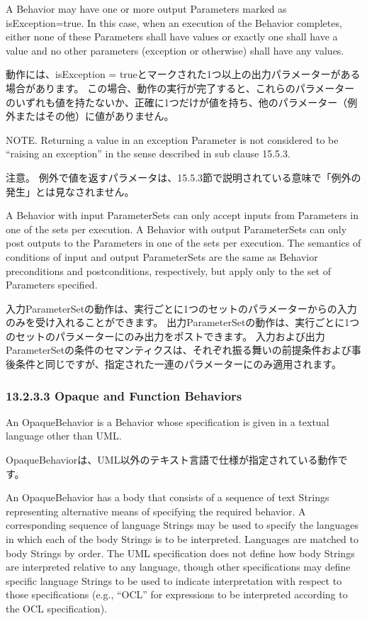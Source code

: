 \documentclass[a4paper,11pt]{ltjsarticle}
\begin{document}
A Behavior may have one or more output Parameters marked as isException=true. 
In this case, when an execution of the Behavior completes, either none of these Parameters shall have values or exactly one shall have a value and no other parameters (exception or otherwise) shall have any values.

動作には、isException = trueとマークされた1つ以上の出力パラメーターがある場合があります。
この場合、動作の実行が完了すると、これらのパラメーターのいずれも値を持たないか、正確に1つだけが値を持ち、他のパラメーター（例外またはその他）に値がありません。

NOTE. Returning a value in an exception Parameter is not considered to be “raising an exception” in the sense described in sub clause 15.5.3.

注意。 例外で値を返すパラメータは、15.5.3節で説明されている意味で「例外の発生」とは見なされません。

A Behavior with input ParameterSets can only accept inputs from Parameters in one of the sets per execution. 
A Behavior with output ParameterSets can only post outputs to the Parameters in one of the sets per execution. 
The semantics of conditions of input and output ParameterSets are the same as Behavior preconditions and postconditions, respectively, but apply only to the set of Parameters specified.

入力ParameterSetの動作は、実行ごとに1つのセットのパラメーターからの入力のみを受け入れることができます。
出力ParameterSetの動作は、実行ごとに1つのセットのパラメーターにのみ出力をポストできます。
入力および出力ParameterSetの条件のセマンティクスは、それぞれ振る舞いの前提条件および事後条件と同じですが、指定された一連のパラメーターにのみ適用されます。

\subsubsection*{13.2.3.3 Opaque and Function Behaviors}

An OpaqueBehavior is a Behavior whose specification is given in a textual language other than UML.

OpaqueBehaviorは、UML以外のテキスト言語で仕様が指定されている動作です。

An OpaqueBehavior has a body that consists of a sequence of text Strings representing alternative means of specifying the required behavior. 
A corresponding sequence of language Strings may be used to specify the languages in which each of the body Strings is to be interpreted. 
Languages are matched to body Strings by order. 
The UML specification does not define how body Strings are interpreted relative to any language, though other specifications may define specific language Strings to be used to indicate interpretation with respect to those specifications (e.g., “OCL” for expressions to be interpreted according to the OCL specification).
\end{document}
